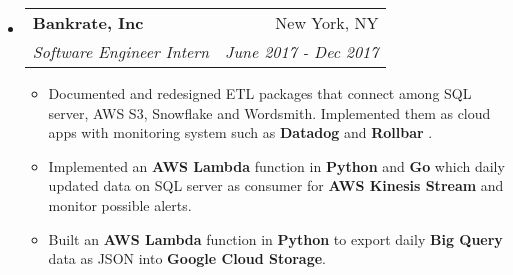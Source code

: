 \documentclass[letterpaper,9pt]{article}
\makeatletter
\newlength{\outerbordwidth}
\newcommand{\resitem}[1]{\item #1 \vspace{-2pt}}
\newcommand{\resheading}[1]{\vspace{0pt}
  \parbox{\textwidth}{\setlength{\FrameSep}{\outerbordwidth}
    \begin{shaded}
\setlength{\fboxsep}{0pt}\framebox[\textwidth][l]{\setlength{\fboxsep}{1pt}\fcolorbox{shadecolorB}{shadecolorB}{\textbf{\sffamily{\mbox{~}\makebox[7.35in][l]{\large #1} \vphantom{p\^{E}}}}}}
    \end{shaded}
  }\vspace{-5pt}
}
\newcommand{\ressubheading}[4]{
\begin{tabular*}{7.1in}{l@{\cftdotfill{\cftsecdotsep}\extracolsep{\fill}}r}
		\textbf{#1} & #2 \\
		\textit{#3} & \textit{#4} \\
\end{tabular*}\vspace{-6pt}}
\makeatother
\begin{document}
\begin{itemize}
\item
	\ressubheading{Bankrate, Inc}{New York, NY}{Software Engineer Intern}{June 2017 - Dec 2017}
	\begin{itemize}
			\resitem{Documented and redesigned ETL packages that connect among SQL server, AWS S3, Snowflake and Wordsmith. Implemented them as cloud apps with monitoring system such as\textbf{ Datadog} and \textbf{Rollbar}}.
\iffalse

			\resitem{Implemented data filters and cleaners in  \textbf{Python} to transform data and pipeline to \textbf{Snowflake} by \textbf{Alooma}. }
\fi
			
\iffalse
			\resitem{Magnaged \textbf{Github} repositories of Data Engineering team. Migrated \textbf{SQL} codes and \textbf{SSIS} packages using Git.}
\fi
\resitem{Implemented an \textbf{AWS Lambda} function in \textbf{Python} and \textbf{Go} which daily updated data on SQL server as consumer for \textbf{AWS Kinesis Stream} and monitor possible alerts.}

\resitem{Built an \textbf{AWS Lambda} function in \textbf{Python} to export daily \textbf{Big Query} data as JSON into \textbf{Google Cloud Storage}.}


	\end{itemize}









\end{itemize}





\end{document}
